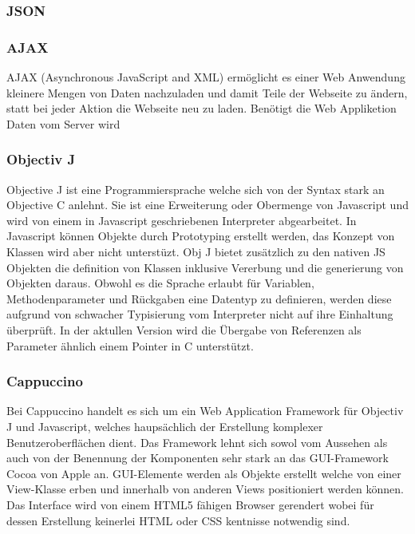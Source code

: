 \subsubsection{JSON}
\label{sec:JSON}

\subsubsection{AJAX}
\label{sec:AJAX}
AJAX (Asynchronous JavaScript and XML) ermöglicht es einer Web Anwendung kleinere Mengen von Daten nachzuladen und damit Teile der Webseite zu ändern, 
statt bei jeder Aktion die Webseite neu zu laden.
Benötigt die Web Appliketion Daten vom Server wird 

\subsubsection{Objectiv J}
\label{sec:Objectiv J}

Objective J ist eine Programmiersprache welche sich von der Syntax stark an Objective C anlehnt.
Sie ist eine Erweiterung oder Obermenge von Javascript und wird von einem in Javascript geschriebenen Interpreter abgearbeitet.
In Javascript können Objekte durch Prototyping erstellt werden, das Konzept von Klassen wird aber nicht unterstüzt.
Obj J bietet zusätzlich zu den nativen JS Objekten die definition von Klassen inklusive Vererbung und die generierung von Objekten daraus.
Obwohl es die Sprache erlaubt für Variablen, Methodenparameter und Rückgaben eine Datentyp zu definieren, 
werden diese aufgrund von schwacher Typisierung vom Interpreter nicht auf ihre Einhaltung überprüft.
In der aktullen Version wird die Übergabe von Referenzen als Parameter ähnlich einem Pointer in C unterstützt.
\cite{capp}

\subsubsection{Cappuccino}
\label{sec:Cappuccino}
Bei Cappuccino handelt es sich um ein Web Application Framework für Objectiv J und Javascript, welches haupsächlich der Erstellung komplexer Benutzeroberflächen dient.
Das Framework lehnt sich sowol vom Aussehen als auch von der Benennung der Komponenten sehr stark an das GUI-Framework Cocoa von Apple an.
GUI-Elemente werden als Objekte erstellt welche von einer View-Klasse erben und innerhalb von anderen Views positioniert werden können.
Das Interface wird von einem HTML5 fähigen Browser gerendert wobei für dessen Erstellung keinerlei HTML oder CSS kentnisse notwendig sind.

